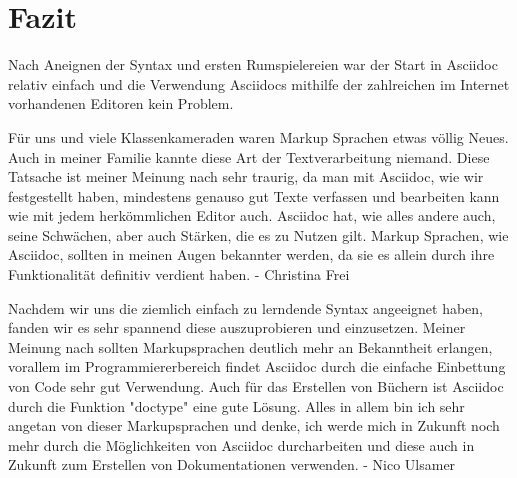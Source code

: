 \documentclass[11pt]{amsbook}
\begin{document}
\hypertarget{x-fazit}{\chapter*{Fazit}}
Nach Aneignen der Syntax und ersten Rumspielereien war der Start in Asciidoc relativ einfach und die Verwendung Asciidocs mithilfe der zahlreichen im Internet vorhandenen Editoren kein Problem.


Für uns und viele Klassenkameraden waren Markup Sprachen etwas völlig Neues. Auch in meiner Familie kannte diese Art der Textverarbeitung niemand. Diese Tatsache ist meiner Meinung nach sehr traurig, da man mit Asciidoc, wie wir festgestellt haben, mindestens genauso gut Texte verfassen und bearbeiten kann wie mit jedem herkömmlichen Editor auch. Asciidoc hat, wie alles andere auch, seine Schwächen, aber auch Stärken, die es zu Nutzen gilt. Markup Sprachen, wie Asciidoc, sollten in meinen Augen bekannter werden, da sie es allein durch ihre Funktionalität definitiv verdient haben. - Christina Frei


Nachdem wir uns die ziemlich einfach zu lerndende Syntax angeeignet haben, fanden wir es sehr spannend diese auszuprobieren und einzusetzen. Meiner Meinung nach sollten Markupsprachen deutlich mehr an Bekanntheit erlangen, vorallem im Programmiererbereich findet Asciidoc durch die einfache Einbettung von Code sehr gut Verwendung. Auch für das Erstellen von Büchern ist Asciidoc durch die Funktion "doctype" eine gute Lösung. Alles in allem bin ich sehr angetan von dieser Markupsprachen und denke, ich werde mich in Zukunft noch mehr durch die Möglichkeiten von Asciidoc durcharbeiten und diese auch in Zukunft zum Erstellen von Dokumentationen verwenden. - Nico Ulsamer
\end{document}
